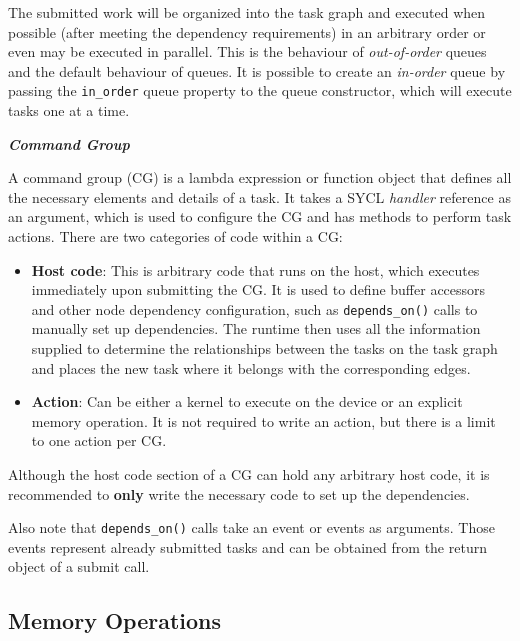 The submitted work will be organized into the task graph and executed when possible (after meeting the dependency requirements) in an arbitrary order or even may be executed in parallel.
This is the behaviour of \textit{out-of-order} queues and the default behaviour of queues.
It is possible to create an \textit{in-order} queue by passing the \texttt{in\_order} queue property to the queue constructor, which will execute tasks one at a time.

\vspace{5mm}
\textsl{\textbf{{Command Group}}}
\vspace{2mm}

A command group (CG) is a lambda expression or function object \cite{Jarvi:2010:CLE} that defines all the necessary elements and details of a task.
It takes a SYCL \textit{handler} reference as an argument, which is used to configure the CG and has methods to perform task actions.
There are two categories of code within a CG:
\begin{itemize}
    \item \textbf{Host code}: This is arbitrary code that runs on the host, which executes immediately upon submitting the CG.
    It is used to define buffer accessors and other node dependency configuration, such as \texttt{depends\_on()} calls to manually set up dependencies.
    The runtime then uses all the information supplied to determine the relationships between the tasks on the task graph and places the new task where it belongs with the corresponding edges.
    \item \textbf{Action}: Can be either a kernel to execute on the device or an explicit memory operation.
    It is not required to write an action, but there is a limit to one action per CG.    
\end{itemize}

Although the host code section of a CG can hold any arbitrary host code, it is recommended to \textbf{only} write the necessary code to set up the dependencies.

Also note that \texttt{depends\_on()} calls take an event or events as arguments.
Those events represent already submitted tasks and can be obtained from the return object of a submit call.

\subsection{Memory Operations}

